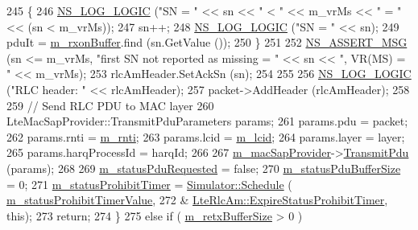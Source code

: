 \begin{DoxyCode}
245         \{
246           \hyperlink{group__logging_ga88acd260151caf2db9c0fc84997f45ce}{NS\_LOG\_LOGIC} (\textcolor{stringliteral}{"SN = "} << sn << \textcolor{stringliteral}{" < "} << m\_vrMs << \textcolor{stringliteral}{" = "} << (sn < m\_vrMs));
247           sn++;
248           \hyperlink{group__logging_ga88acd260151caf2db9c0fc84997f45ce}{NS\_LOG\_LOGIC} (\textcolor{stringliteral}{"SN = "} << sn);
249           pduIt = \hyperlink{classns3_1_1LteRlcAm_a7442b4f97fccd0c393dd9f27325a853a}{m\_rxonBuffer}.find (sn.GetValue ());
250         \}
251       
252       \hyperlink{assert_8h_aff5ece9066c74e681e74999856f08539}{NS\_ASSERT\_MSG} (sn <= m\_vrMs, \textcolor{stringliteral}{"first SN not reported as missing = "} << sn << \textcolor{stringliteral}{", VR(MS) = 
      "} << m\_vrMs);      
253       rlcAmHeader.SetAckSn (sn); 
254 
255 
256       \hyperlink{group__logging_ga88acd260151caf2db9c0fc84997f45ce}{NS\_LOG\_LOGIC} (\textcolor{stringliteral}{"RLC header: "} << rlcAmHeader);
257       packet->AddHeader (rlcAmHeader);
258 
259       \textcolor{comment}{// Send RLC PDU to MAC layer}
260       LteMacSapProvider::TransmitPduParameters params;
261       params.pdu = packet;
262       params.rnti = \hyperlink{classns3_1_1LteRlc_a48ab0a78e7f2687337075b1c8832df70}{m\_rnti};
263       params.lcid = \hyperlink{classns3_1_1LteRlc_a051085e9b27883e7ba4b98ad7242fd8a}{m\_lcid};
264       params.layer = layer;
265       params.harqProcessId = harqId;
266 
267       \hyperlink{classns3_1_1LteRlc_a69272d17c4e48183bb89b8dd0660c1be}{m\_macSapProvider}->\hyperlink{classns3_1_1LteMacSapProvider_a125622cc614fa4ef620d595fbec0cf07}{TransmitPdu} (params);
268 
269       \hyperlink{classns3_1_1LteRlcAm_afd4ce0824f86cfb394f0492383f98a3b}{m\_statusPduRequested} = \textcolor{keyword}{false};
270       \hyperlink{classns3_1_1LteRlcAm_a722cecd1994be0d51675dea14b187623}{m\_statusPduBufferSize} = 0;
271       \hyperlink{classns3_1_1LteRlcAm_af32da019a7f906fd00bba0f15927817a}{m\_statusProhibitTimer} = \hyperlink{classns3_1_1Simulator_a671882c894a08af4a5e91181bf1eec13}{Simulator::Schedule} (
      \hyperlink{classns3_1_1LteRlcAm_a1c8b01b233f231652fa48e32d3ee3be7}{m\_statusProhibitTimerValue},
272                                                    &
      \hyperlink{classns3_1_1LteRlcAm_a8388fe48c85820f1ea9606a8b04d28cb}{LteRlcAm::ExpireStatusProhibitTimer}, \textcolor{keyword}{this});
273       \textcolor{keywordflow}{return};
274     \}
275   \textcolor{keywordflow}{else} \textcolor{keywordflow}{if} ( \hyperlink{classns3_1_1LteRlcAm_af270916ffd1805b027a7b9cc05c91e7d}{m\_retxBufferSize} > 0 )

\end{DoxyCode}
